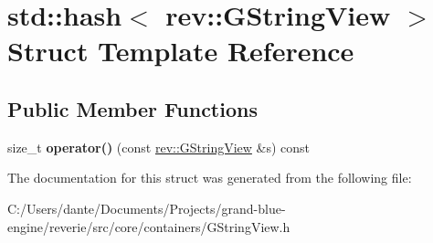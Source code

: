 \hypertarget{structstd_1_1hash_3_01rev_1_1_g_string_view_01_4}{}\section{std\+::hash$<$ rev\+::G\+String\+View $>$ Struct Template Reference}
\label{structstd_1_1hash_3_01rev_1_1_g_string_view_01_4}
\subsection*{Public Member Functions}
\begin{DoxyCompactItemize}
\item 
\mbox{\label{structstd_1_1hash_3_01rev_1_1_g_string_view_01_4_a36cb987e7e3d86767f55940f69c3ea42}} 
size\+\_\+t {\bfseries operator()} (const \mbox{\hyperlink{classrev_1_1_g_string_view}{rev\+::\+G\+String\+View}} \&s) const
\end{DoxyCompactItemize}


The documentation for this struct was generated from the following file\+:\begin{DoxyCompactItemize}
\item 
C\+:/\+Users/dante/\+Documents/\+Projects/grand-\/blue-\/engine/reverie/src/core/containers/G\+String\+View.\+h\end{DoxyCompactItemize}
